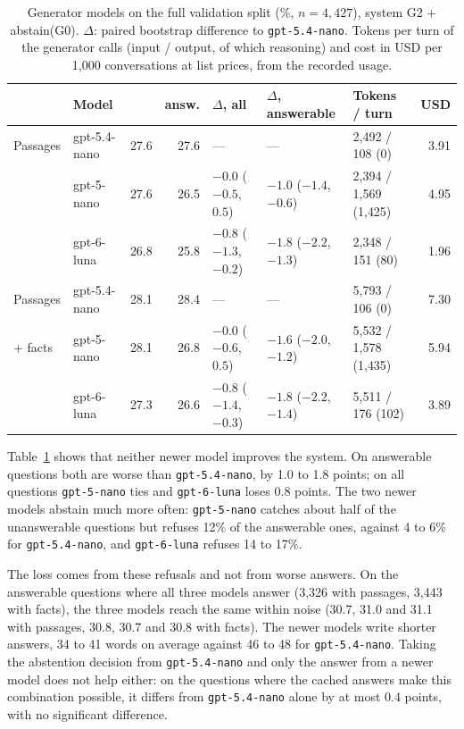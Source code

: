 \begin{table}[ht]
    \centering
    \caption{Generator models on the full validation split (\%, $n = 4{,}427$), system
    G2 + abstain(G0). $\Delta$: paired bootstrap difference to \texttt{gpt-5.4-nano}.
    Tokens per turn of the generator calls (input / output, of which reasoning) and cost
    in USD per 1,000 conversations at list prices, from the recorded usage.}
    \label{tab:convgen:models}
    \small
    \begin{tabular}{llrrlllr}
        \toprule
        & Model & \fone{} & answ. & $\Delta$, all & $\Delta$, answerable & Tokens / turn & USD \\
        \midrule
        Passages & gpt-5.4-nano & 27.6 & 27.6 & ---                    & ---                     & 2{,}492 / 108 (0)     & 3.91 \\
                 & gpt-5-nano   & 27.6 & 26.5 & $-0.0$ ($-0.5$, $0.5$) & $-1.0$ ($-1.4$, $-0.6$) & 2{,}394 / 1{,}569 (1{,}425) & 4.95 \\
                 & gpt-6-luna   & 26.8 & 25.8 & $-0.8$ ($-1.3$, $-0.2$) & $-1.8$ ($-2.2$, $-1.3$) & 2{,}348 / 151 (80)   & 1.96 \\
        \midrule
        Passages & gpt-5.4-nano & 28.1 & 28.4 & ---                    & ---                     & 5{,}793 / 106 (0)     & 7.30 \\
        + facts  & gpt-5-nano   & 28.1 & 26.8 & $-0.0$ ($-0.6$, $0.5$) & $-1.6$ ($-2.0$, $-1.2$) & 5{,}532 / 1{,}578 (1{,}435) & 5.94 \\
                 & gpt-6-luna   & 27.3 & 26.6 & $-0.8$ ($-1.4$, $-0.3$) & $-1.8$ ($-2.2$, $-1.4$) & 5{,}511 / 176 (102)  & 3.89 \\
        \bottomrule
    \end{tabular}
\end{table}

Table~\ref{tab:convgen:models} shows that neither newer model improves the system. On
answerable questions both are worse than \texttt{gpt-5.4-nano}, by 1.0 to 1.8 points; on
all questions \texttt{gpt-5-nano} ties and \texttt{gpt-6-luna} loses 0.8 points. The two newer
models abstain much more often: \texttt{gpt-5-nano} catches about half of the unanswerable
questions but refuses 12\% of the answerable ones, against 4 to 6\% for
\texttt{gpt-5.4-nano}, and \texttt{gpt-6-luna} refuses 14 to 17\%.

The loss comes from these refusals and not from worse answers. On the answerable
questions where all three models answer (3{,}326 with passages, 3{,}443 with facts), the
three models reach the same \fone{} within noise (30.7, 31.0 and 31.1 with passages,
30.8, 30.7 and 30.8 with facts). The newer models write shorter answers, 34 to 41 words on
average against 46 to 48 for \texttt{gpt-5.4-nano}. Taking the abstention decision from
\texttt{gpt-5.4-nano} and only the answer from a newer model does not help either: on the
questions where the cached answers make this combination possible, it differs from
\texttt{gpt-5.4-nano} alone by at most 0.4 points, with no significant difference.

